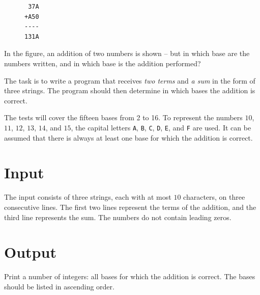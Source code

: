 
\begin{figure}
\centering
\begin{verbatim}
 37A
+A50
----
131A
\end{verbatim}
\end{figure}

In the figure, an addition of two numbers is shown -- but in which base are the numbers written, and
in which base is the addition performed?

The task is to write a program that receives \emph{two terms} and \emph{a sum} in the form
of three strings. The program should then determine in which bases the addition is correct.

The tests will cover the fifteen bases from 2 to 16. To represent the numbers $10$, $11$, $12$, $13$, $14$, and $15$,
the capital letters \texttt{A}, \texttt{B}, \texttt{C}, \texttt{D}, \texttt{E}, and \texttt{F} are used.
It can be assumed that there is always at least one base for which the addition is correct.

\section*{Input}
The input consists of three strings, each with at most $10$ characters, on three consecutive lines.
The first two lines represent the terms of the addition, and the third line represents the sum.
The numbers do not contain leading zeros.

\section*{Output}
Print a number of integers: all bases for which the addition is correct.
The bases should be listed in ascending order.
